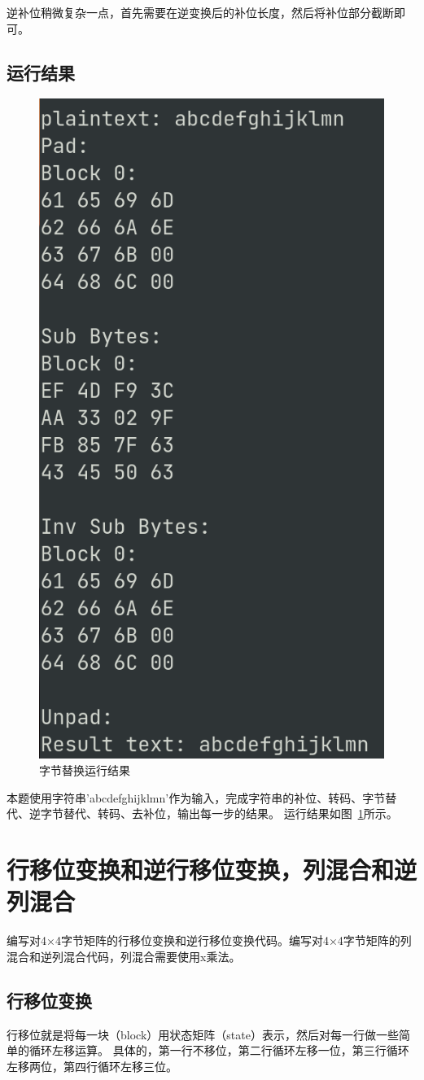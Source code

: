 \documentclass[degree=project,degree-type=project,cjk-font=noto]{thuthesis}
\begin{document}
逆补位稍微复杂一点，首先需要在逆变换后的补位长度，然后将补位部分截断即可。

\subsection{运行结果}

\begin{figure}[h]
\centering%
\includegraphics[width=.4\linewidth]{aes_t1.png}
  \caption{字节替换运行结果}
  \label{fig:t1}
\end{figure}

本题使用字符串'abcdefghijklmn'作为输入，完成字符串的补位、转码、字节替代、逆字节替代、转码、去补位，输出每一步的结果。
运行结果如图~\ref{fig:t1}所示。

\section{行移位变换和逆行移位变换，列混合和逆列混合}

    编写对4×4字节矩阵的行移位变换和逆行移位变换代码。编写对4×4字节矩阵的列混合和逆列混合代码，列混合需要使用x乘法。

\subsection{行移位变换}

行移位就是将每一块（block）用状态矩阵（state）表示，然后对每一行做一些简单的循环左移运算。
具体的，第一行不移位，第二行循环左移一位，第三行循环左移两位，第四行循环左移三位。
\end{document}
